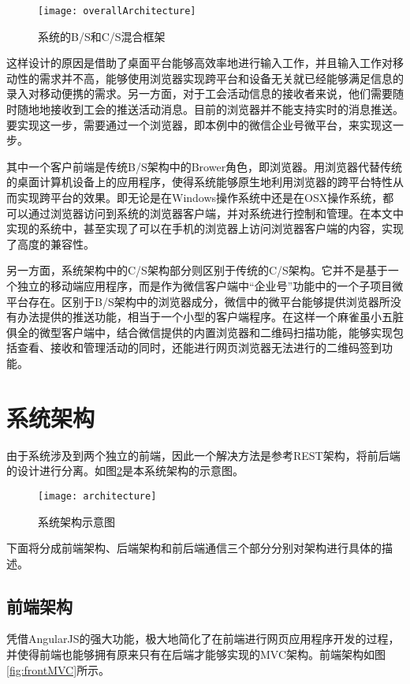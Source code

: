 \begin{figure}[H]
  \centering
  \texttt{[image: overallArchitecture]}
  \caption{系统的B/S和C/S混合框架}
  \label{fig:overallArchitecture}
\end{figure}

这样设计的原因是借助了桌面平台能够高效率地进行输入工作，并且输入工作对移动性的需求并不高，能够使用浏览器实现跨平台和设备无关就已经能够满足信息的录入对移动便携的需求。另一方面，对于工会活动信息的接收者来说，他们需要随时随地地接收到工会的推送活动消息。目前的浏览器并不能支持实时的消息推送。要实现这一步，需要通过一个浏览器，即本例中的微信企业号微平台，来实现这一步。

其中一个客户前端是传统B/S架构中的Brower角色，即浏览器。用浏览器代替传统的桌面计算机设备上的应用程序，使得系统能够原生地利用浏览器的跨平台特性从而实现跨平台的效果。即无论是在Windows操作系统中还是在OSX操作系统，都可以通过浏览器访问到系统的浏览器客户端，并对系统进行控制和管理。在本文中实现的系统中，甚至实现了可以在手机的浏览器上访问浏览器客户端的内容，实现了高度的兼容性。

另一方面，系统架构中的C/S架构部分则区别于传统的C/S架构。它并不是基于一个独立的移动端应用程序，而是作为微信客户端中“企业号”功能中的一个子项目微平台存在。区别于B/S架构中的浏览器成分，微信中的微平台能够提供浏览器所没有办法提供的推送功能，相当于一个小型的客户端程序。在这样一个麻雀虽小五脏俱全的微型客户端中，结合微信提供的内置浏览器和二维码扫描功能，能够实现包括查看、接收和管理活动的同时，还能进行网页浏览器无法进行的二维码签到功能。

\section{系统架构}

由于系统涉及到两个独立的前端，因此一个解决方法是参考REST架构，将前后端的设计进行分离。如图\ref{fig:architecture}是本系统架构的示意图。

\begin{figure}[H]
  \centering
  \texttt{[image: architecture]}
  \caption{系统架构示意图}
  \label{fig:architecture}
\end{figure}

下面将分成前端架构、后端架构和前后端通信三个部分分别对架构进行具体的描述。

\subsection{前端架构}

凭借AngularJS的强大功能，极大地简化了在前端进行网页应用程序开发的过程，并使得前端也能够拥有原来只有在后端才能够实现的MVC架构。前端架构如图\ref{fig:frontMVC}所示。

